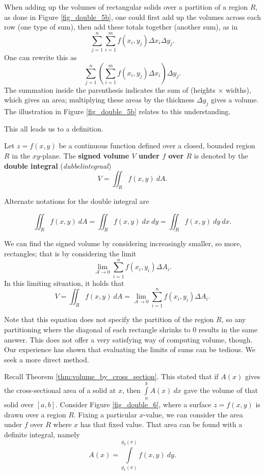  When adding up the volumes of rectangular solids over a partition of a region $R$, as done in Figure \ref{fig_double_5b}, one could first add up the volumes across each row (one type of sum), then add these totals together (another sum), as in
$$\sum_{j=1}^n\sum_{i=1}^mf(x_i,y_j)\Delta x_i\Delta y_j.$$
One can rewrite this  as
$$\sum_{j=1}^n\left(\sum_{i=1}^mf(x_i,y_j)\Delta x_i\right)\Delta y_j.$$
The summation inside the parenthesis indicates the sum of (heights $\times$ widths), which gives an area; multiplying these areas by the thickness $\Delta y_j$ gives a volume. The illustration in Figure \ref{fig_double_5b} relates to this understanding.

This all leads us to a definition.

\begin{definition}\label{def:double_int}
Let $z=f(x,y)$ be a continuous function defined over a closed, bounded region $R$ in the $xy$-plane. The \textbf{signed volume $V$ under $f$ over $R$} is denoted by the \textbf{double integral} (\textit{dubbelintegraal})
$$V = \iint_R f(x,y)\ dA.$$
\end{definition}

Alternate notations for the double integral are

$$\iint_R f(x,y)\ dA=\iint_R f(x,y)\ dx\ dy=\iint_R f(x,y)\ dy\ dx.$$

We can find the signed volume by considering increasingly smaller, so more, rectangles; that is by considering the limit
$$\lim_{\mathcal{A}\to 0}\sum_{i=1}^n f(x_i,y_i)\Delta A_i.$$
In this limiting situation, it holds that 
\begin{equation}
V = \iint_R f(x,y)\ dA = \lim_{\mathcal{A}\to 0}\sum_{i=1}^n f(x_i,y_i)\Delta A_i.
\label{thm:double_int}
\end{equation}

Note that this equation does not specify the partition of the region $R$, so any partitioning where the diagonal of each rectangle shrinks to 0 results in the same answer. This does not offer a very satisfying way of computing volume, though. Our experience has shown that evaluating the limits of sums can be tedious. We seek a more direct method.

Recall Theorem \ref{thm:volume_by_cross_section}. This stated that if $A(x)$ gives the cross-sectional area of a solid at $x$, then $\int\limits_a^b A(x)\ dx$ gave the volume of that solid over $[a,b]$. Consider Figure \ref{fig_double_6}, where a surface $z=f(x,y)$ is drawn over a region $R$. Fixing a particular $x$-value, we can consider the area under $f$ over $R$ where $x$ has that fixed value. That area can be found with a definite integral, namely 
$$ 
A(x)=\int\limits_{g_1(x)}^{g_2(x)} f(x,y)\ dy.
$$


